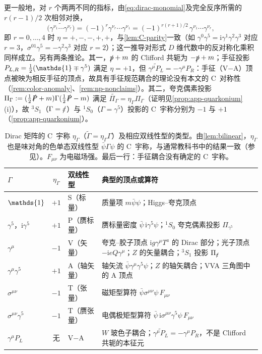 \documentclass[UTF8,a4paper,11pt,fontset=fandol]{ctexart}
\let\amsmathbb\mathbb
\renewcommand{\mathbb}[1]{\ifx1#1\mathds{1}\else\amsmathbb{#1}\fi}
\theoremstyle{cplain}
\theoremstyle{cdefinition}
\theoremstyle{cremark}
\numberwithin{equation}{section}
\newcommand{\sla}[1]{\slashed{#1}}                  %
\newcommand{\ii}{\mathrm{i}}                        %
\newcommand{\Cconj}[1]{\widetilde{#1}}              %
\begin{document}
更一般地，对 $r$ 个两两不同的指标，由\cref{eq:dirac-monomial}及完全反序所需的 $r(r-1)/2$ 次相邻对换，
\begin{equation}\label{eq:dirac-grade}
\Cconj{\bigl(\gamma^{\nu_1}\cdots\gamma^{\nu_r}\bigr)}=(-1)^r\gamma^{\nu_r}\cdots\gamma^{\nu_1}=(-1)^{r(r+1)/2}\,\gamma^{\nu_1}\cdots\gamma^{\nu_r},
\end{equation}
即 $r=0,\dots,4$ 时 $\eta=+,-,-,+,+$，与\cref{lem:C-parity}一致（如 $\gamma^0\gamma^5=\ii\gamma^1\gamma^2\gamma^3$ 对应 $r=3$，$\sigma^{01}\gamma^5=-\gamma^2\gamma^3$ 对应 $r=2$）；这一推导对形式 $D$ 维代数中的反对称化乘积同样成立。另有两条推论。其一，$\sla p+m$ 的 Clifford 共轭为 $-\sla p+m$；手征投影 $P_{L,R}=\tfrac12(\mathbb 1\mp\gamma^5)$ 满足 $\eta=+1$，但 $\Cconj{\gamma^\mu P_L}=-\gamma^\mu P_R$：手征（V$-$A）顶点被映为相反手征的顶点，故具有手征规范耦合的理论没有本文的 C~对称性（\cref{rem:color-anomaly}、\cref{rem:np-nonclaims}）。其二，夸克偶素投影 $\Pi_\Gamma:=(\tfrac12\sla P+m)\Gamma(\tfrac12\sla P-m)$ 满足 $\Cconj{\Pi_\Gamma}=\eta_\Gamma\Pi_\Gamma$（证明见\cref{prop:app-quarkonium}(i)），故 ${}^3S_1$（$\Gamma=\sla\varepsilon$）与 ${}^1S_0$（$\Gamma=\gamma^5$）投影的 C~宇称分别为 $-1$ 与 $+1$（\cref{prop:app-quarkonium}）。

\begin{table}[htbp]
\centering
\caption{Dirac 矩阵的 C~宇称 $\eta_\Gamma$（$\Cconj\Gamma=\eta_\Gamma\Gamma$）及相应双线性型的类型。由\cref{lem:bilinear}，$\eta_\Gamma$ 也是味对角的色单态双线性型 $\bar\psi\Gamma\psi$ 的 C~宇称，与通常教科书中的结果一致（参见\cite[第~3.6~节]{PeskinSchroeder1995}）。$F_{\mu\nu}$ 为电磁场强。最后一行：手征耦合没有确定的 C~宇称。}
\label{tab:C-parity}
\small
\begin{tabularx}{\textwidth}{@{}l c l X@{}}
\toprule
$\Gamma$ & $\eta_\Gamma$ & 双线性型 & 典型的顶点或算符 \\
\midrule
$\mathbb 1$ & $+1$ & S（标量） & 质量项 $m\bar\psi\psi$；Higgs--夸克顶点 \\
$\gamma^5$，$\ii\gamma^5$ & $+1$ & P（赝标量） & 赝标量密度 $\bar\psi\,\ii\gamma^5\psi$；${}^1S_0$ 夸克偶素投影 $\Pi_{\gamma^5}$ \\
$\gamma^\mu$ & $-1$ & V（矢量） & 夸克--胶子顶点 $\ii g\gamma^\mu T^a$ 的 Dirac 部分；光子顶点 $-\ii eQ\gamma^\mu$；$Z$ 的矢量耦合；${}^3S_1$ 投影 $\Pi_{\sla\varepsilon}$ \\
$\gamma^\mu\gamma^5$ & $+1$ & A（轴矢量） & 轴矢流 $\bar\psi\gamma^\mu\gamma^5\psi$；$Z$ 的轴矢耦合；VVA 三角图中的 A 顶点 \\
$\sigma^{\mu\nu}$ & $-1$ & T（张量） & 磁矩型算符 $\bar\psi\sigma^{\mu\nu}\psi\,F_{\mu\nu}$ \\
$\sigma^{\mu\nu}\gamma^5$ & $-1$ & T（赝张量） & 电偶极矩型算符 $\bar\psi\,\ii\sigma^{\mu\nu}\gamma^5\psi\,F_{\mu\nu}$ \\
\midrule
$\gamma^\mu P_L$ & 无 & V$-$A & $W$ 玻色子耦合；$\Cconj{\gamma^\mu P_L}=-\gamma^\mu P_R$，不是 Clifford 共轭的本征元 \\
\bottomrule
\end{tabularx}
\end{table}
\end{document}
